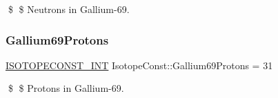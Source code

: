 \$ \$ Neutrons in Gallium-\/69. \mbox{\label{group___isotope_const-_gallium-_ga69_ga095d9657ca12b1b8c9869d5dc6fc3dfc}} 
\subsubsection{\texorpdfstring{Gallium69\+Protons}{Gallium69Protons}}
{\footnotesize\ttfamily \mbox{\hyperlink{group___isotope_const-_macros_ga5f18360b3e99483a35c32d789e62621c}{I\+S\+O\+T\+O\+P\+E\+C\+O\+N\+S\+T\+\_\+\+I\+NT}} Isotope\+Const\+::\+Gallium69\+Protons = 31}

\$ \$ Protons in Gallium-\/69. 